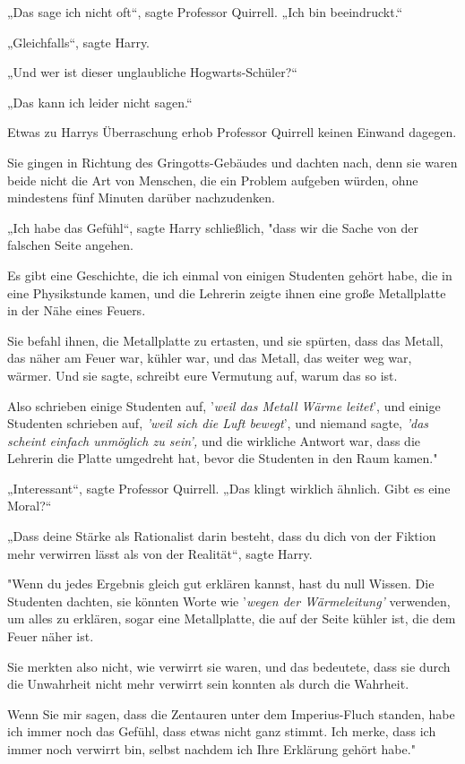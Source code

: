 {„Das sage ich nicht oft“, sagte Professor Quirrell. „Ich bin beeindruckt.“

„Gleichfalls“, sagte Harry.

„Und wer ist dieser unglaubliche Hogwarts-Schüler?“

„Das kann ich leider nicht sagen.“

Etwas zu Harrys Überraschung erhob Professor Quirrell keinen Einwand dagegen.

Sie gingen in Richtung des Gringotts-Gebäudes und dachten nach, denn sie waren beide nicht die Art von Menschen, die ein Problem aufgeben würden, ohne mindestens fünf Minuten darüber nachzudenken.

„Ich habe das Gefühl“, sagte Harry schließlich, "dass wir die Sache von der falschen Seite angehen.

Es gibt eine Geschichte, die ich einmal von einigen Studenten gehört habe, die in eine Physikstunde kamen, und die Lehrerin zeigte ihnen eine große Metallplatte in der Nähe eines Feuers.

Sie befahl ihnen, die Metallplatte zu ertasten, und sie spürten, dass das Metall, das näher am Feuer war, kühler war, und das Metall, das weiter weg war, wärmer. Und sie sagte, schreibt eure Vermutung auf, warum das so ist.

Also schrieben einige Studenten auf, '\emph{weil das Metall Wärme leitet}', und einige Studenten schrieben auf, \emph{'weil sich die Luft bewegt}', und niemand sagte, \emph{'das scheint einfach unmöglich zu sein',} und die wirkliche Antwort war, dass die Lehrerin die Platte umgedreht hat, bevor die Studenten in den Raum kamen."

„Interessant“, sagte Professor Quirrell. „Das klingt wirklich ähnlich. Gibt es eine Moral?“

„Dass deine Stärke als Rationalist darin besteht, dass du dich von der Fiktion mehr verwirren lässt als von der Realität“, sagte Harry.

"Wenn du jedes Ergebnis gleich gut erklären kannst, hast du null Wissen. Die Studenten dachten, sie könnten Worte wie '\emph{wegen der Wärmeleitung'} verwenden, um alles zu erklären, sogar eine Metallplatte, die auf der Seite kühler ist, die dem Feuer näher ist.

Sie merkten also nicht, wie verwirrt sie waren, und das bedeutete, dass sie durch die Unwahrheit nicht mehr verwirrt sein konnten als durch die Wahrheit.

Wenn Sie mir sagen, dass die Zentauren unter dem Imperius-Fluch standen, habe ich immer noch das Gefühl, dass etwas nicht ganz stimmt. Ich merke, dass ich immer noch verwirrt bin, selbst nachdem ich Ihre Erklärung gehört habe."

}
